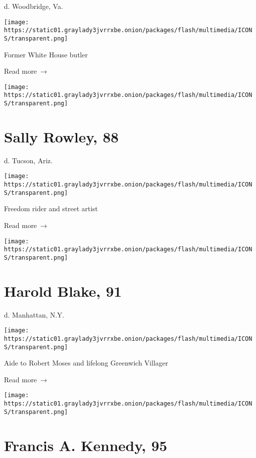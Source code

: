 d. Woodbridge, Va.

\texttt{[image: https://static01.graylady3jvrrxbe.onion/packages/flash/multimedia/ICONS/transparent.png]}

Former White House butler

 Read more~→

\href{https://www.nytimes3xbfgragh.onion/2020/05/21/obituaries/sally-rowley-dead-coronavirus.html}{}

\texttt{[image: https://static01.graylady3jvrrxbe.onion/packages/flash/multimedia/ICONS/transparent.png]}

\hypertarget{sally-rowley-88}{%
\section{Sally Rowley, 88}\label{sally-rowley-88}}

d. Tucson, Ariz.

\texttt{[image: https://static01.graylady3jvrrxbe.onion/packages/flash/multimedia/ICONS/transparent.png]}

Freedom rider and street artist

 Read more~→

\href{https://www.nytimes3xbfgragh.onion/2020/05/21/nyregion/harold-blake-dead-coronavirus.html}{}

\texttt{[image: https://static01.graylady3jvrrxbe.onion/packages/flash/multimedia/ICONS/transparent.png]}

\hypertarget{harold-blake-91}{%
\section{Harold Blake, 91}\label{harold-blake-91}}

d. Manhattan, N.Y.

\texttt{[image: https://static01.graylady3jvrrxbe.onion/packages/flash/multimedia/ICONS/transparent.png]}

Aide to Robert Moses and lifelong Greenwich Villager

 Read more~→

\href{https://www.nytimes3xbfgragh.onion/2020/05/20/us/francis-a-kennedy-dead-coronavirus.html}{}

\texttt{[image: https://static01.graylady3jvrrxbe.onion/packages/flash/multimedia/ICONS/transparent.png]}

\hypertarget{francis-a-kennedy-95}{%
\section{Francis A. Kennedy, 95}\label{francis-a-kennedy-95}}

